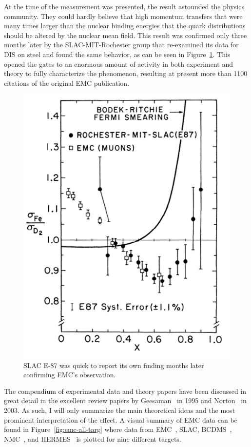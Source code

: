 At the time of the measurement was presented, the result astounded the physics community. They could hardly believe that high momentum transfers that were many times larger than the nuclear binding energies that the quark distributions should be altered by the nuclear mean field. This result was confirmed only three months later by the SLAC-MIT-Rochester group that re-examined its data for DIS on steel\cite{PhysRevLett.50.1431} and found the same behavior, as can be seen in Figure~\ref{fig:emc-e87}. This opened the gates to an enormous amount of activity in both experiment and theory to fully characterize the phenomenon, resulting at present more than 1100 citations of the original EMC publication\cite{Aubert:1983xm}. \setlength{\columnsep}{28pt} \begin{figure}
	\centering
	\includegraphics[height=0.35\textheight]{figures/background/SLAC-E87.png}
	\caption{SLAC E-87 was quick to report its own finding months later confirming EMC's observation\cite{PhysRevLett.50.1431}.}
	\vspace{-20pt}
	\label{fig:emc-e87}
\end{figure} The compendium of experimental data and theory papers have been discussed in great detail in the excellent review papers by Geesaman~\cite{Geesaman:1995yd} in 1995 and Norton~\cite{norton:emc-review} in 2003. As such, I will only summarize the main theoretical ideas and the most prominent interpretation of the effect. A visual summary of EMC data can be found in Figure~\ref{fig:emc-all-targ} where data from EMC~\cite{Aubert:1983xm}, SLAC\cite{Arnold:1983mw, Gomez:1993ri}, BCDMS~\cite{Benvenuti:1987az}, NMC~\cite{Amaudruz:1991nw}, and HERMES~\cite{Ackerstaff:1999ac} is plotted for nine different targets.

